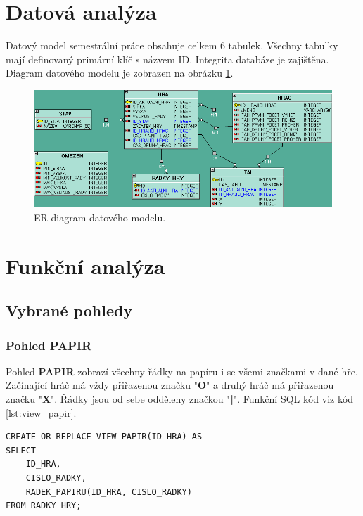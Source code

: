 \documentclass[12pt, a4paper]{article}
\begin{document}
\section{Datová analýza}
Datový model semestrální práce obsahuje celkem 6 tabulek. Všechny tabulky mají definovaný primární klíč s názvem ID. Integrita databáze je zajištěna.
Diagram datového modelu je zobrazen na obrázku \ref{fig:model}.
\begin{figure}[h]
	\centering
	\includegraphics[width=1\linewidth]{img/data_model.png}
	\caption{ER diagram datového modelu.}
	\label{fig:model}
\end{figure}

\section{Funkční analýza}
	\subsection{Vybrané pohledy}
		\subsubsection{Pohled PAPIR}
		Pohled \textbf{PAPIR} zobrazí všechny řádky na papíru i se všemi značkami v dané hře. Začínající hráč má vždy přiřazenou značku "\textbf{O}" a druhý hráč má přiřazenou značku "\textbf{X}". Řádky jsou od sebe odděleny značkou "\textbf{|}". Funkční SQL kód viz kód \ref{lst:view_papir}.

		\begin{lstlisting}[caption = {SQL kód pohledu \textbf{PAPIR}.}, label = {lst:view_papir}, captionpos=b, frame=single]
CREATE OR REPLACE VIEW PAPIR(ID_HRA) AS
SELECT 
	ID_HRA, 
	CISLO_RADKY,
	RADEK_PAPIRU(ID_HRA, CISLO_RADKY)
FROM RADKY_HRY;
		\end{lstlisting}
\end{document}
